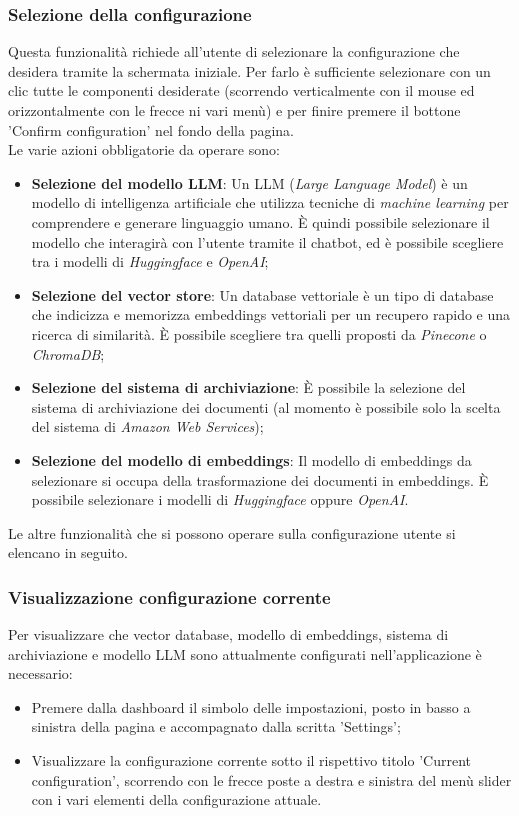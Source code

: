 \documentclass[10pt, a4paper]{article}
\begin{document}
\subsubsection{Selezione della configurazione}
Questa funzionalità richiede all'utente di selezionare la configurazione che desidera tramite la schermata iniziale. Per farlo è sufficiente selezionare con un clic tutte le componenti desiderate (scorrendo verticalmente con il mouse ed orizzontalmente con le frecce ni vari menù) e per finire premere il bottone 'Confirm configuration' nel fondo della pagina.\\ Le varie azioni obbligatorie da operare sono: 
\begin{itemize}
    \item \textbf{Selezione del modello LLM}: Un LLM (\textit{Large Language Model}) è un modello di intelligenza artificiale che utilizza tecniche di \textit{machine learning} per comprendere e generare linguaggio umano. È quindi possibile selezionare il modello che interagirà con l'utente tramite il chatbot, ed è possibile scegliere tra i modelli di \textit{Huggingface} e \textit{OpenAI};
    \item \textbf{Selezione del vector store}: Un database vettoriale è un tipo di database che indicizza e memorizza embeddings vettoriali per un recupero rapido e una ricerca di similarità. È possibile scegliere tra quelli proposti da \textit{Pinecone} o \textit{ChromaDB};
    \item \textbf{Selezione del sistema di archiviazione}: È possibile la selezione del sistema di archiviazione dei documenti (al momento è possibile solo la scelta del sistema di \textit{Amazon Web Services});
    \item \textbf{Selezione del modello di embeddings}: Il modello di embeddings da selezionare si occupa della trasformazione dei documenti in embeddings. È possibile selezionare i modelli di \textit{Huggingface} oppure \textit{OpenAI}.
\end{itemize}

Le altre funzionalità che si possono operare sulla configurazione utente si elencano in seguito.
\subsubsection{Visualizzazione configurazione corrente}
Per visualizzare che vector database, modello di embeddings, sistema di archiviazione e modello LLM sono attualmente configurati nell'applicazione è necessario:
\begin{itemize}
    \item Premere dalla dashboard il simbolo delle impostazioni, posto in basso a sinistra della pagina e accompagnato dalla scritta 'Settings';
    \item Visualizzare la configurazione corrente sotto il rispettivo titolo 'Current configuration', scorrendo con le frecce poste a destra e sinistra del menù slider con i vari elementi della configurazione attuale.
\end{itemize}
\end{document}
